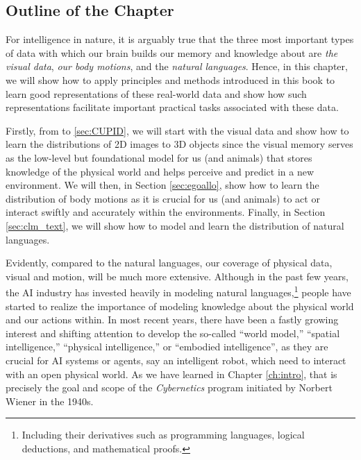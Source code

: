 \documentclass[../../book-main.tex]{subfiles}
\begin{document}
\subsection{Outline of the Chapter}
\label{sec:application_outline}
For intelligence in nature, it is arguably true that the three most
important types of data with which our brain builds our memory and
knowledge about are {\em the visual data}, {\em our body motions},
and the {\em natural languages}. Hence, in this chapter, we will show
how to apply principles and methods introduced in this book to learn
good representations of these real-world data and show how such
representations facilitate important practical tasks associated with these data.

Firstly, from  to
\ref{sec:CUPID}, we will start with the visual data and show how to
learn the distributions of 2D images to 3D objects since the visual
memory serves as the low-level but foundational model for us (and
animals) that stores knowledge of the physical world and helps
perceive and predict in a new environment. We will then, in Section
\ref{sec:egoallo}, show how to learn the distribution of body motions
as it is crucial for us (and animals) to act or interact swiftly and
accurately within the environments. Finally, in Section
\ref{sec:clm_text}, we will show how to model and learn the
distribution of natural languages.

Evidently, compared to the natural languages, our coverage of
physical data, visual and motion, will be much more extensive.
Although in the past few years, the AI industry has invested heavily
in modeling natural languages,\footnote{Including their derivatives
    such as programming languages, logical deductions, and mathematical
proofs.} people have started to realize the importance of modeling
knowledge about the physical world and our actions within. In most
recent years, there have been a fastly growing interest and shifting
attention to develop the so-called ``world model,'' ``spatial
intelligence,'' ``physical intelligence,'' or ``embodied
intelligence'', as they are crucial for AI systems or agents, say an
intelligent robot, which need to interact with an open physical
world. As we have learned in Chapter \ref{ch:intro}, that is
precisely the goal and scope of the {\em  Cybernetics} program
initiated by Norbert Wiener in the 1940s.
\end{document}

